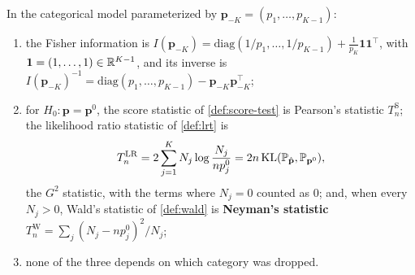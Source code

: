 \begin{proposition}
\label{prop:gof-three}
In the categorical model parameterized by $\mathbf{p}_{-K} = (p_1, \ldots, p_{K-1})$:
\begin{enumerate}[nosep]
\item the Fisher information is $I(\mathbf{p}_{-K}) = \mathrm{diag}(1/p_1, \ldots, 1/p_{K-1}) + \frac{1}{p_K}\mathbf{1}\mathbf{1}^\top$, with $\mathbf{1} = (1, \ldots, 1) \in \mathbb{R}^{K-1}$, and its inverse is $I(\mathbf{p}_{-K})^{-1} = \mathrm{diag}(p_1, \ldots, p_{K-1}) - \mathbf{p}_{-K}\mathbf{p}_{-K}^\top$;
\item for $H_0: \mathbf{p} = \mathbf{p}^0$, the score statistic of \cref{def:score-test} is Pearson's statistic $T^{\mathrm{S}}_n$; the likelihood ratio statistic of \cref{def:lrt} is
\[
T^{\mathrm{LR}}_n = 2\sum_{j=1}^K N_j\log\frac{N_j}{np^0_j} = 2n\,\mathrm{KL}(\mathbb{P}_{\hat{\mathbf{p}}}, \mathbb{P}_{\mathbf{p}^0}),
\]
the $G^2$ statistic, with the terms where $N_j = 0$ counted as $0$; and, when every $N_j > 0$, Wald's statistic of \cref{def:wald} is \textbf{Neyman's statistic} $T^{\mathrm{W}}_n = \sum_j (N_j - np^0_j)^2/N_j$;
\item none of the three depends on which category was dropped.
\end{enumerate}
\end{proposition}

